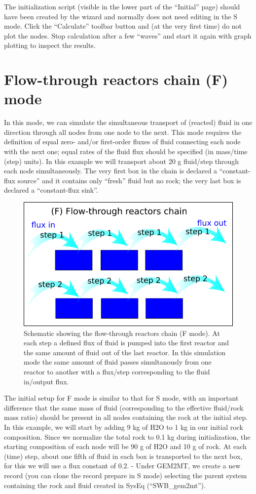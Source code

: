 \documentclass[
]{book}
\begin{document}
The initialization script (visible in the lower part of the ``Initial'' page) should have been created by the wizard and normally does not need editing in the S mode. Click the ``Calculate'' toolbar button and (at the very first time) do not plot the nodes. Stop calculation after a few ``waves'' and start it again with graph plotting to inspect the results.

\hypertarget{flow-through-reactors-chain-f-mode}{%
\section{Flow-through reactors chain (F) mode}\label{flow-through-reactors-chain-f-mode}}

In this mode, we can simulate the simultaneous transport of (reacted) fluid in one direction through all nodes from one node to the next. This mode requires the definition of equal zero- and/or first-order fluxes of fluid connecting each node with the next one; equal rates of the fluid flux should be specified (in mass/time (step) units). In this example we will transport about 20 g fluid/step through each node simultaneously. The very first box in the chain is declared a ``constant-flux source'' and it contains only ``fresh'' fluid but no rock; the very last box is declared a ``constant-flux sink''.

\begin{figure}
\includegraphics[width=0.7\linewidth]{figures/module5/fig-2} \caption{Schematic showing the flow-through reactors chain (F mode). At each step a defined flux of fluid is pumped into the first reactor and the same amount of fluid out of the last reactor. In this simulation mode the same amount of fluid passes simultanously from one reactor to another with a flux/step corresponding to the fluid in/output flux.}\label{fig:fig-2e}
\end{figure}

The initial setup for F mode is similar to that for S mode, with an important difference that the same mass of fluid (corresponding to the effective fluid/rock mass ratio) should be present in all nodes containing the rock at the initial step. In this example, we will start by adding 9 kg of H2O to 1 kg in our initial rock composition. Since we normalize the total rock to 0.1 kg during initialization, the starting composition of each node will be 90 g of H2O and 10 g of rock. At each (time) step, about one fifth of fluid in each box is transported to the next box, for this we will use a flux constant of 0.2.
- Under GEM2MT, we create a new record (you can clone the record prepare in S mode) selecting the parent system containing the rock and fluid created in SysEq (``SWB\_gem2mt'').
\end{document}
